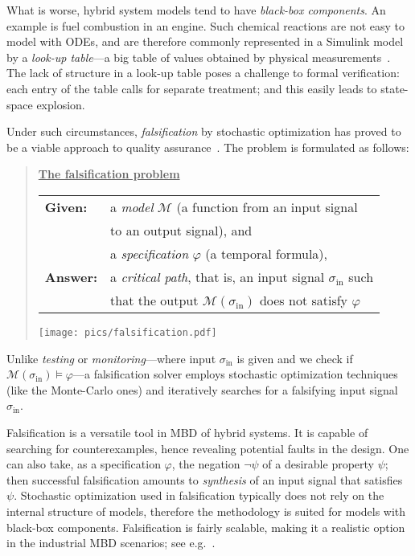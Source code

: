 \documentclass[envcountsect,orivec]{llncs} \usepackage{etex} \usepackage[]{graphicx}
\begin{document}
What is worse, hybrid
system models tend to have \emph{black-box components}. An example is
fuel combustion in an engine.  Such chemical reactions are not easy to
model with
ODEs, and are therefore commonly represented in a Simulink model 
by a \emph{look-up table}---a big table of values obtained by  physical measurements~\cite{DBLP:conf/hybrid/JinDKUB14,HoxhaAF14arch1}. 
The lack of structure in a look-up table poses a
challenge to formal verification:  each entry of the table
calls for separate treatment; and this 
easily leads to state-space explosion.

Under such circumstances,  \emph{falsification} by
stochastic optimization has proved to be a viable
approach to quality
assurance~\cite{DBLP:conf/tacas/AnnpureddyLFS11,DBLP:conf/hybrid/JinDKUB14,HoxhaAF14arch1}. The
problem is formulated as follows:
\begin{quote}
  \underline{\bfseries The falsification problem}

  \begin{tabular}{ll}
    \textbf{Given:} 
    & a \emph{model} $\mathcal{M}$ (a function from an input signal \\
    & to  an output signal), and\\
    & a \emph{specification} $\varphi$ (a temporal formula),\\
    \textbf{Answer:} 
    & a \emph{critical path}, that is, an input signal $\sigma_{\mathrm{in}}$ such\\
    & that the output $\mathcal{M}(\sigma_{\mathrm{in}})$ does not satisfy $\varphi$ 
  \end{tabular}
  \texttt{[image: pics/falsification.pdf]}
\end{quote}
Unlike \emph{testing} or \emph{monitoring}---where input $\sigma_{\mathrm{in}}$ is given and
we check if $\mathcal{M}(\sigma_{\mathrm{in}})\models \varphi$---a
falsification solver employs stochastic optimization techniques (like
the Monte-Carlo ones) and iteratively searches for a falsifying input
signal
$\sigma_{\mathrm{in}}$.

Falsification is a versatile tool in MBD of hybrid systems.  It is
capable of searching for counterexamples, hence revealing potential
faults in the design. One can also take, as a specification $\varphi$,
the negation $\lnot \psi$ of a desirable property $\psi$; then
successful falsification amounts to \emph{synthesis} of an input signal that
satisfies $\psi$.  Stochastic optimization used in falsification
typically does not rely on the internal structure of models, therefore the
methodology is suited for models with black-box
components. Falsification is fairly scalable, making it 
a realistic option in
the industrial MBD scenarios; see e.g.~\cite{HoxhaAF14arch1,DBLP:conf/hybrid/JinDKUB14}.
\end{document}
